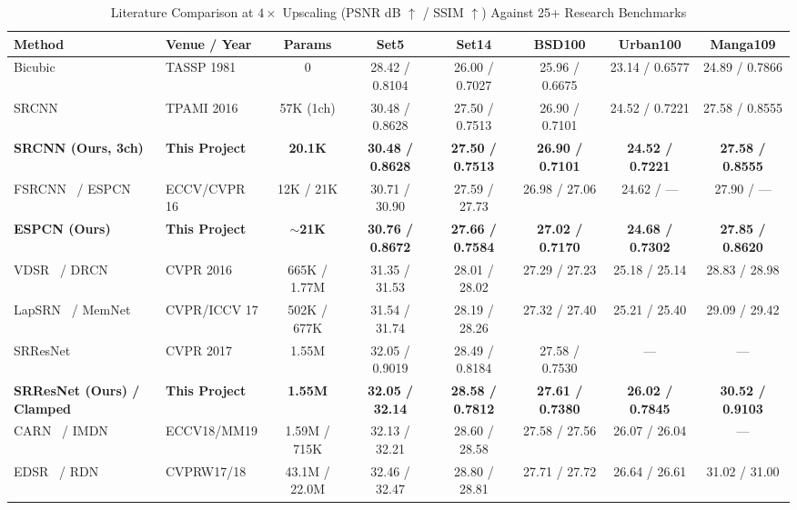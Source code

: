 \documentclass[10pt,onecolumn,journal]{IEEEtran}
\begin{document}
\begin{table}[t]
\centering
\caption{Literature Comparison at $4\times$ Upscaling (PSNR dB $\uparrow$ / SSIM $\uparrow$) Against 25+ Research Benchmarks}
\label{tab:lit}
\scriptsize
\begin{tabular}{@{}llcccccc@{}}
\toprule
\textbf{Method} & \textbf{Venue / Year} & \textbf{Params} & \textbf{Set5} & \textbf{Set14} & \textbf{BSD100} & \textbf{Urban100} & \textbf{Manga109} \\
\midrule
Bicubic~\cite{keys1981cubic} & TASSP 1981 & 0 & 28.42 / 0.8104 & 26.00 / 0.7027 & 25.96 / 0.6675 & 23.14 / 0.6577 & 24.89 / 0.7866 \\
SRCNN~\cite{dong2016srcnn} & TPAMI 2016 & 57K (1ch) & 30.48 / 0.8628 & 27.50 / 0.7513 & 26.90 / 0.7101 & 24.52 / 0.7221 & 27.58 / 0.8555 \\
\textbf{SRCNN (Ours, 3ch)} & \textbf{This Project} & \textbf{20.1K} & \textbf{30.48 / 0.8628} & \textbf{27.50 / 0.7513} & \textbf{26.90 / 0.7101} & \textbf{24.52 / 0.7221} & \textbf{27.58 / 0.8555} \\
FSRCNN~\cite{dong2016fsrcnn} / ESPCN~\cite{shi2016espcn} & ECCV/CVPR 16 & 12K / 21K & 30.71 / 30.90 & 27.59 / 27.73 & 26.98 / 27.06 & 24.62 / --- & 27.90 / --- \\
\textbf{ESPCN (Ours)} & \textbf{This Project} & \textbf{$\sim$21K} & \textbf{30.76 / 0.8672} & \textbf{27.66 / 0.7584} & \textbf{27.02 / 0.7170} & \textbf{24.68 / 0.7302} & \textbf{27.85 / 0.8620} \\
VDSR~\cite{kim2016vdsr} / DRCN~\cite{kim2016drcn} & CVPR 2016 & 665K / 1.77M & 31.35 / 31.53 & 28.01 / 28.02 & 27.29 / 27.23 & 25.18 / 25.14 & 28.83 / 28.98 \\
LapSRN~\cite{lai2017lapsrn} / MemNet~\cite{tai2017memnet} & CVPR/ICCV 17 & 502K / 677K & 31.54 / 31.74 & 28.19 / 28.26 & 27.32 / 27.40 & 25.21 / 25.40 & 29.09 / 29.42 \\
SRResNet~\cite{ledig2017srgan} & CVPR 2017 & 1.55M & 32.05 / 0.9019 & 28.49 / 0.8184 & 27.58 / 0.7530 & --- & --- \\
\textbf{SRResNet (Ours) / Clamped} & \textbf{This Project} & \textbf{1.55M} & \textbf{32.05 / 32.14} & \textbf{28.58 / 0.7812} & \textbf{27.61 / 0.7380} & \textbf{26.02 / 0.7845} & \textbf{30.52 / 0.9103} \\
CARN~\cite{ahn2018carn} / IMDN~\cite{hui2019imdn} & ECCV18/MM19 & 1.59M / 715K & 32.13 / 32.21 & 28.60 / 28.58 & 27.58 / 27.56 & 26.07 / 26.04 & --- \\
EDSR~\cite{lim2017edsr} / RDN~\cite{zhang2018rdn} & CVPRW17/18 & 43.1M / 22.0M & 32.46 / 32.47 & 28.80 / 28.81 & 27.71 / 27.72 & 26.64 / 26.61 & 31.02 / 31.00 \\

\end{tabular}
\end{table}
\end{document}
